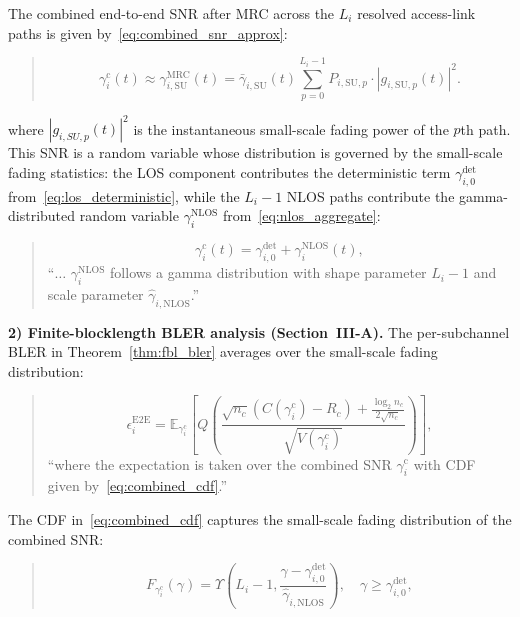 The combined end-to-end SNR after MRC across the $L_i$ resolved access-link paths is given by~\eqref{eq:combined_snr_approx}:

\begin{quote}
\begin{equation*}
\gamma_i^{\mathrm{c}}(t) \approx \gamma_{i,\mathrm{SU}}^{\mathrm{MRC}}(t) = \bar{\gamma}_{i,\mathrm{SU}}(t) \sum_{p=0}^{L_i-1} P_{i,\mathrm{SU},p} \cdot |g_{i,\mathrm{SU},p}(t)|^2.
\end{equation*}
\end{quote}

\noindent where $|g_{i,SU,p}(t)|^2$ is the instantaneous small-scale fading power of the $p$th path. This SNR is a random variable whose distribution is governed by the small-scale fading statistics: the LOS component contributes the deterministic term $\gamma_{i,0}^{\mathrm{det}}$ from~\eqref{eq:los_deterministic}, while the $L_i - 1$ NLOS paths contribute the gamma-distributed random variable $\gamma_i^{\mathrm{NLOS}}$ from~\eqref{eq:nlos_aggregate}:

\begin{quote}
\begin{equation*}
\gamma_i^{\mathrm{c}}(t) = \gamma_{i,0}^{\mathrm{det}} + \gamma_i^{\mathrm{NLOS}}(t),
\end{equation*}
``$\ldots$ $\gamma_i^{\mathrm{NLOS}}$ follows a gamma distribution with shape parameter $L_i - 1$ and scale parameter $\hat{\gamma}_{i,\mathrm{NLOS}}$.''
\end{quote}

\textbf{2) Finite-blocklength BLER analysis (Section~III-A).}
The per-subchannel BLER in Theorem~\ref{thm:fbl_bler} averages over the small-scale fading distribution:

\begin{quote}
\begin{equation*}
\epsilon_i^{\mathrm{E2E}} = \mathbb{E}_{\gamma_i^{\mathrm{c}}}\left[Q\left(\frac{\sqrt{n_c}\left(C(\gamma_i^{\mathrm{c}}) - R_c\right) + \frac{\log_2 n_c}{2\sqrt{n_c}}}{\sqrt{V(\gamma_i^{\mathrm{c}})}}\right)\right],
\end{equation*}
``where the expectation is taken over the combined SNR $\gamma_i^{\mathrm{c}}$ with CDF given by~\eqref{eq:combined_cdf}.''
\end{quote}

The CDF in~\eqref{eq:combined_cdf} captures the small-scale fading distribution of the combined SNR:

\begin{quote}
\begin{equation*}
F_{\gamma_i^{\mathrm{c}}}(\gamma) = \Upsilon\left(L_i-1, \frac{\gamma - \gamma_{i,0}^{\mathrm{det}}}{\hat{\gamma}_{i,\mathrm{NLOS}}}\right), \quad \gamma \geq \gamma_{i,0}^{\mathrm{det}},
\end{equation*}
\end{quote}


